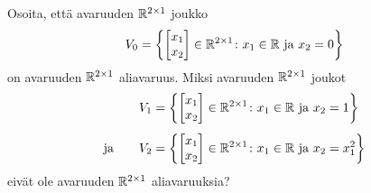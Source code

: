 \documentclass[11pt,a4paper]{amsart}
\begin{document}
\begin{exercise}
  Osoita, että avaruuden \(\mathbb{R}^{2\times 1}\) joukko
  \[
    V_0 = \left\{
      \begin{bmatrix} x_1 \\ x_2
      \end{bmatrix}
      \in \mathbb{R}^{2\times 1}
      \colon x_1 \in \mathbb{R} \text{ ja } x_2 = 0
    \right\}
  \]
  on avaruuden \(\mathbb{R}^{2\times 1}\) aliavaruus. Miksi avaruuden
  \(\mathbb{R}^{2\times 1}\) joukot
  \[
    \begin{aligned}
      V_1 &= \left\{
        \begin{bmatrix} x_1 \\ x_2
        \end{bmatrix}
        \in \mathbb{R}^{2\times 1}
        \colon x_1 \in \mathbb{R} \text{ ja } x_2 = 1
      \right\}
      \\[1ex]
      \text{ja}\qquad
      V_2 &= \left\{
        \begin{bmatrix} x_1 \\ x_2
        \end{bmatrix}
        \in \mathbb{R}^{2\times 1}
        \colon x_1 \in \mathbb{R} \text{ ja } x_2 = x_1^2
      \right\}
    \end{aligned}
  \]
  eivät ole avaruuden \(\mathbb{R}^{2\times 1}\) aliavaruuksia?
\end{exercise}
\end{document}
